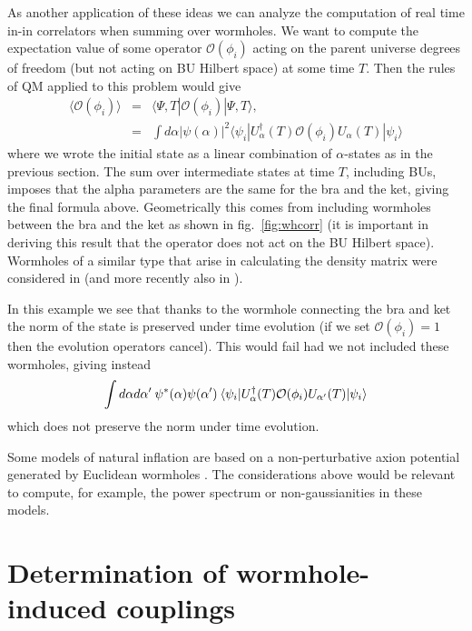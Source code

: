 \documentclass[11pt]{article}
\numberwithin{equation}{section}
\newcommand{\beq}{\begin{equation}}
\newcommand{\eeq}{\end{equation}}
\begin{document}
As another application of these ideas we can analyze the computation of real time in-in correlators when summing over wormholes. We want to compute the expectation value of some operator $\mathcal{O}(\phi_i)$ acting on the parent universe degrees of freedom (but not acting on BU Hilbert space) at some time $T$. Then the rules of QM applied to this problem would give 
\begin{eqnarray}
\langle \mathcal{O}(\phi_i)\rangle &=& \langle \Psi, T | \mathcal{O}(\phi_i) | \Psi, T\rangle, \nonumber\\
&=& \int d\alpha |\psi(\alpha)|^2 \langle \psi_i | U_\alpha^\dagger(T) \mathcal{O}(\phi_i) U_\alpha(T) | \psi_i \rangle
\end{eqnarray} 
where we wrote the initial state as a linear combination of $\alpha$-states as in the previous section. The sum over intermediate states at time $T$, including BUs, imposes that the alpha parameters are  the same for the bra and the ket, giving the final formula above. Geometrically this comes from including wormholes between the bra and the ket as shown in fig.~\ref{fig:whcorr} (it is important in deriving this result that the operator does not act on the BU Hilbert space). Wormholes of a similar type that arise in calculating the density matrix were considered in \cite{Page:1986vw} (and more recently also in \cite{Maldacena:2019cbz}). 

In this example we see that thanks to the wormhole connecting the bra and ket the norm of the state is preserved under time evolution (if we set $\mathcal{O}(\phi_i) = 1$ then the evolution operators cancel). This would fail had we not included these wormholes, giving instead 
\beq
 \int d\alpha d\alpha' \hspace{0.08cm}\psi^*(\alpha)\psi(\alpha') \hspace{0.08cm} \langle \psi_i | U_\alpha^\dagger(T) \mathcal{O}(\phi_i) U_{\alpha'}(T) | \psi_i \rangle
\eeq
which does not preserve the norm under time evolution.

Some models of natural inflation are based on a non-perturbative axion potential generated by Euclidean wormholes \cite{Rey:1989mg, PhysRevLett.65.3233, Hebecker:2016dsw}. The considerations above would be relevant to compute, for example, the power spectrum or non-gaussianities in these models. 

\section{Determination of wormhole-induced couplings}
\end{document}
